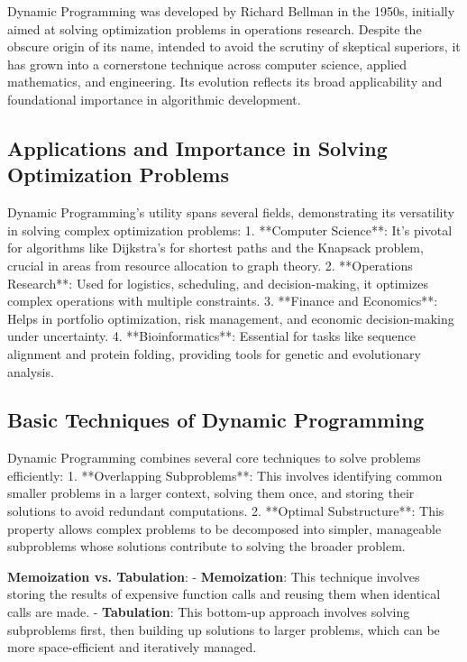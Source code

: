 \documentclass[12pt]{book} %
\begin{document}
Dynamic Programming was developed by Richard Bellman in the 1950s, initially aimed at solving optimization problems in operations research. Despite the obscure origin of its name, intended to avoid the scrutiny of skeptical superiors, it has grown into a cornerstone technique across computer science, applied mathematics, and engineering. Its evolution reflects its broad applicability and foundational importance in algorithmic development.

\subsection{Applications and Importance in Solving Optimization Problems}

Dynamic Programming's utility spans several fields, demonstrating its versatility in solving complex optimization problems:
1. **Computer Science**: It's pivotal for algorithms like Dijkstra's for shortest paths and the Knapsack problem, crucial in areas from resource allocation to graph theory.
2. **Operations Research**: Used for logistics, scheduling, and decision-making, it optimizes complex operations with multiple constraints.
3. **Finance and Economics**: Helps in portfolio optimization, risk management, and economic decision-making under uncertainty.
4. **Bioinformatics**: Essential for tasks like sequence alignment and protein folding, providing tools for genetic and evolutionary analysis.

\subsection{Basic Techniques of Dynamic Programming}

Dynamic Programming combines several core techniques to solve problems efficiently:
1. **Overlapping Subproblems**: This involves identifying common smaller problems in a larger context, solving them once, and storing their solutions to avoid redundant computations.
2. **Optimal Substructure**: This property allows complex problems to be decomposed into simpler, manageable subproblems whose solutions contribute to solving the broader problem. 

\textbf{Memoization vs. Tabulation}:
\newline
- \textbf{Memoization}: This technique involves storing the results of expensive function calls and reusing them when identical calls are made.\newline
- \textbf{Tabulation}: This bottom-up approach involves solving subproblems first, then building up solutions to larger problems, which can be more space-efficient and iteratively managed.
\end{document}
